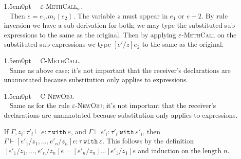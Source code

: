 \documentclass{llncs}
\newcommand{\keywadj}[1]{\mathtt{#1}}
\newcommand{\keyw}[1]{\keywadj{#1}~}
\newcommand{\proofcase}[2]{
	\begin{adjustwidth}{1.5em}{0pt}
		\fbox{Case.}~~#1. \\ ~#2
	\end{adjustwidth}
}
\begin{document}
{	\proofcase{\textsc{$\varepsilon$-MethCall$_\sigma$}} {
		Then $e =e _1.m_i(e_2)$. The variable $z$ must appear in $e_1$ or $e-2$. By rule inversion we have a sub-derivation for both; we may type the substituted sub-expressions to the same as the original. Then by applying \textsc{$\varepsilon$-MethCall} on the substituted sub-expressions we type $[e'/z]e_2$ to the same as the original. \\
	}
		
	\proofcase{\textsc{C-MethCall}} {
		Same as above case; it's not important that the receiver's declarations are unannotated because substitution only applies to expressions. \\
	}
	
	\proofcase{\textsc{C-NewObj}} {
		Same as for the rule \textsc{$\varepsilon$-NewObj}; it's not important that the receiver's declarations are unannotated because substitution only applies to expressions.
	}
}

\noindent
{} If $\Gamma, z_i : \tau'_i \vdash e : \tau~\keyw{with} \varepsilon$, and $\Gamma \vdash e'_i : \tau'_i~\keyw{with} \varepsilon'_i$, then $\Gamma \vdash [e'_1/z_1, ..., e'_n/z_n]e : \tau~\keyw{with} \varepsilon$. This follows by the definition $[e'_1/z_1, ..., e'_n/z_n]e = [e'_n/z_n]...[e'_1/z_1]e$ and induction on the length $n$. \\
\end{document}
